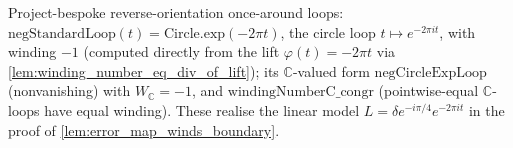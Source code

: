 \begin{definition}


  \label{def:reverse_loop}
  Project-bespoke reverse-orientation once-around loops:
  $\mathrm{negStandardLoop}(t)=\mathrm{Circle.exp}(-2\pi t)$, the circle loop
  $t\mapsto e^{-2\pi i t}$, with winding $-1$ (computed directly from the lift
  $\varphi(t)=-2\pi t$ via \cref{lem:winding_number_eq_div_of_lift}); its
  $\mathbb{C}$-valued form
  $\mathrm{negCircleExpLoop}$ (nonvanishing) with $W_{\mathbb{C}}=-1$, and
  $\mathrm{windingNumberC\_congr}$ (pointwise-equal $\mathbb{C}$-loops have equal
  winding). These realise the linear model $L=\delta e^{-i\pi/4}e^{-2\pi i t}$ in
  the proof of \cref{lem:error_map_winds_boundary}.
\end{definition}

